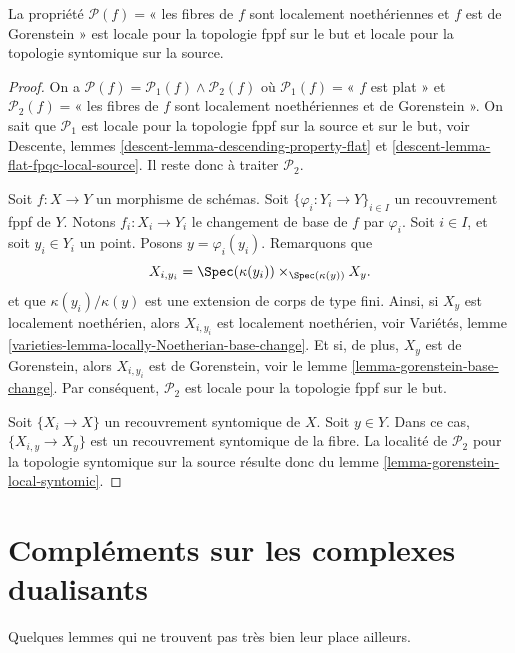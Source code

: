 \begin{lemma}
\label{lemma-gorenstein-local-source-and-target}
La propriété
$\mathcal{P}(f)=$« les fibres de $f$ sont localement noethériennes et $f$ est de Gorenstein »
est locale pour la topologie fppf sur le but et locale pour la topologie syntomique sur la source.
\end{lemma}

\begin{proof}
On a
$\mathcal{P}(f) =
\mathcal{P}_1(f) \wedge \mathcal{P}_2(f)$
où
$\mathcal{P}_1(f)=$« $f$ est plat » et
$\mathcal{P}_2(f)=$« les fibres de $f$ sont localement noethériennes et de Gorenstein ».
On sait que $\mathcal{P}_1$ est locale pour la topologie fppf sur la source et sur le but, voir Descente, lemmes \ref{descent-lemma-descending-property-flat} et \ref{descent-lemma-flat-fpqc-local-source}. Il reste donc à traiter $\mathcal{P}_2$.

\medskip\noindent
Soit $f : X \to Y$ un morphisme de schémas. Soit $\{\varphi_i : Y_i \to Y\}_{i \in I}$ un recouvrement fppf de $Y$. Notons $f_i : X_i \to Y_i$ le changement de base de $f$ par $\varphi_i$. Soit $i \in I$, et soit $y_i \in Y_i$ un point. Posons $y = \varphi_i(y_i)$. Remarquons que
$$
X_{i, y_i} = \Spec(\kappa(y_i)) \times_{\Spec(\kappa(y))} X_y.
$$
et que $\kappa(y_i)/\kappa(y)$ est une extension de corps de type fini. Ainsi, si $X_y$ est localement noethérien, alors $X_{i, y_i}$ est localement noethérien, voir Variétés, lemme \ref{varieties-lemma-locally-Noetherian-base-change}. Et si, de plus, $X_y$ est de Gorenstein, alors $X_{i, y_i}$ est de Gorenstein, voir le lemme \ref{lemma-gorenstein-base-change}. Par conséquent, $\mathcal{P}_2$ est locale pour la topologie fppf sur le but.

\medskip\noindent
Soit $\{X_i \to X\}$ un recouvrement syntomique de $X$. Soit $y \in Y$. Dans ce cas, $\{X_{i, y} \to X_y\}$ est un recouvrement syntomique de la fibre. La localité de $\mathcal{P}_2$ pour la topologie syntomique sur la source résulte donc du lemme \ref{lemma-gorenstein-local-syntomic}.
\end{proof}




\section{Compléments sur les complexes dualisants}
\label{section-more-dualizing}

\noindent
Quelques lemmes qui ne trouvent pas très bien leur place ailleurs.

